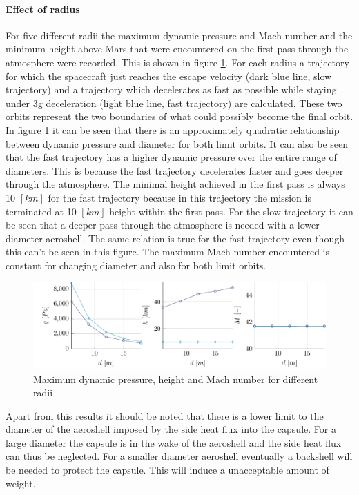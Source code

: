 \paragraph{Effect of radius}

For five different radii the maximum dynamic pressure and Mach number and the minimum height above Mars that were encountered on the first pass through the atmosphere were recorded. This is shown in figure \ref{fig:radius}. For each radius a trajectory for which the spacecraft just reaches the escape velocity (dark blue line, slow trajectory) and a trajectory which decelerates as fast as possible while staying under 3g deceleration (light blue line, fast trajectory) are calculated. These two orbits represent the two boundaries of what could possibly become the final orbit. In figure \ref{fig:radius} it can be seen that there is an approximately quadratic relationship between dynamic pressure and diameter for both limit orbits. It can also be seen that the fast trajectory has a higher dynamic pressure over the entire range of diameters. This is because the fast trajectory decelerates faster and goes deeper through the atmosphere. The minimal height achieved in the first pass is always 10 $\left[km\right]$ for the fast trajectory because in this trajectory the mission is terminated at 10 $\left[km\right]$ height within the first pass. For the slow trajectory it can be seen that a deeper pass through the atmosphere is needed with a lower diameter aeroshell. The same relation is true for the fast trajectory even though this can't be seen in this figure. The maximum Mach number encountered is constant for changing diameter and also for both limit orbits.
\begin{figure}[H]
	\centering
	\includegraphics[width=\textwidth]{./Figure/orbit/radius_param.pdf}
	\caption{Maximum dynamic pressure, height and Mach number for different radii}
	\label{fig:radius}
\end{figure}


Apart from this results it should be noted that there is a lower limit to the diameter of the aeroshell imposed by the side heat flux into the capsule. For a large diameter the capsule is in the wake of the aeroshell and the side heat flux can thus be neglected. For a smaller diameter aeroshell eventually a backshell will be needed to protect the capsule. This will induce a unacceptable amount of weight.

